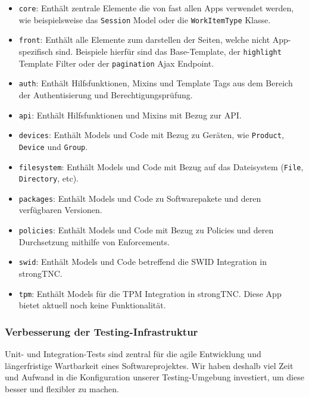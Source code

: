\begin{itemize}
	\item \texttt{core}: Enthält zentrale Elemente die von fast allen Apps
	verwendet werden, wie beispielsweise das \texttt{Session} Model oder die
	\texttt{WorkItemType} Klasse.
		
	\item \texttt{front}: Enthält alle Elemente zum darstellen der Seiten, welche
	nicht App-spezifisch sind. Beispiele hierfür sind das Base-Template, der
	\texttt{highlight} Template Filter oder der \texttt{pagination} Ajax Endpoint.
	
	\item \texttt{auth}: Enthält Hilfsfunktionen, Mixins und Template Tags aus dem
	Bereich der Authentisierung und Berechtigungsprüfung.
	
	\item \texttt{api}: Enthält Hilfsfunktionen und Mixins mit Bezug zur API.
	
	\item \texttt{devices}: Enthält Models und Code mit Bezug zu Geräten, wie
	\texttt{Product}, \texttt{Device} und \texttt{Group}.
		
	\item \texttt{filesystem}: Enthält Models und Code mit Bezug auf das
	Dateisystem (\texttt{File}, \texttt{Directory}, etc).
	
	\item \texttt{packages}: Enthält Models und Code zu Softwarepakete
	und deren verfügbaren Versionen.
		
	\item \texttt{policies}: Enthält Models und Code mit Bezug zu Policies und
	deren Durchsetzung mithilfe von Enforcements.
		
	\item \texttt{swid}: Enthält Models und Code betreffend die SWID Integration
	in strongTNC.
		
	\item \texttt{tpm}: Enthält Models für die TPM Integration in strongTNC. Diese
	App bietet aktuell noch keine Funktionalität.
\end{itemize}

\subsubsection{Verbesserung der Testing-Infrastruktur}
\label{improvements:tests}

Unit- und Integration-Tests sind zentral für die agile Entwicklung und
längerfristige Wartbarkeit eines Softwareprojektes. Wir haben deshalb viel Zeit
und Aufwand in die Konfiguration unserer Testing-Umgebung investiert, um diese
besser und flexibler zu machen.

